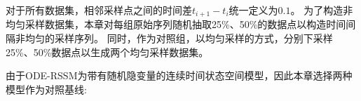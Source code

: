 
对于所有数据集，相邻采样点之间的时间差$t_{i+1}-t_i$统一定义为$0.1$。
为了构造非均匀采样数据集，本章对每组原始序列随机抽取25\%、50\%的数据点以构造时间间隔非均匀的采样序列。
同时，作为对照组，以均匀采样的方式，分别下采样25\%、50\%数据点以生成两个均匀采样数据集。





由于ODE-RSSM为带有随机隐变量的连续时间状态空间模型，因此本章选择两种模型作为对照基线:

